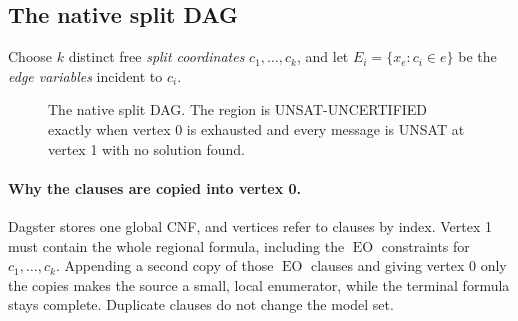 \documentclass[11pt,a4paper]{article}
\theoremstyle{definition}
\newcommand{\EO}{\operatorname{EO}}
\begin{document}
\subsection{The native split DAG}

Choose $k$ distinct free \emph{split coordinates} $c_1,\dots,c_k$, and let
$E_i=\{x_e: c_i\in e\}$ be the \emph{edge variables} incident to $c_i$.

\begin{figure}[H]
\centering
{}
\caption{The native split DAG. The region is UNSAT-UNCERTIFIED exactly when vertex 0 is
exhausted and every message is UNSAT at vertex 1 with no solution found.}
\label{fig:dag}
\end{figure}

\paragraph{Why the clauses are copied into vertex 0.} Dagster stores one global CNF, and
vertices refer to clauses by index. Vertex 1 must contain the whole regional formula,
including the $\EO$ constraints for $c_1,\dots,c_k$. Appending a second copy of those $\EO$
clauses and giving vertex 0 only the copies makes the source a small, local enumerator,
while the terminal formula stays complete. Duplicate clauses do not change the model set.
\end{document}
